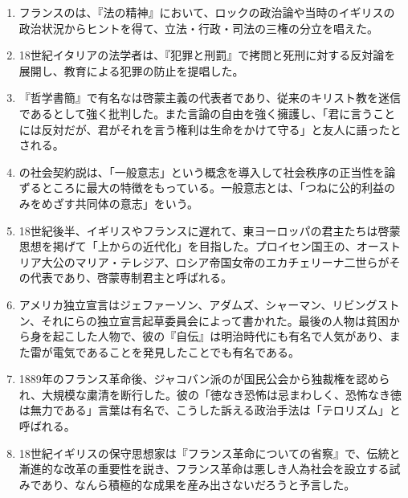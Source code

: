 \documentclass[uplatex,dvipdfmx]{jsarticle}
\begin{document}
\begin{enumerate}


  
\item フランスのは、『法の精神』において、ロックの政治論や当時のイギリスの政治状況からヒントを得て、立法・行政・司法の三権の分立を唱えた。


\item 18世紀イタリアの法学者は、『犯罪と刑罰』で拷問と死刑に対する反対論を展開し、教育による犯罪の防止を提唱した。
  
\item 『哲学書簡』で有名なは啓蒙主義の代表者であり、従来のキリスト教を迷信であるとして強く批判した。また言論の自由を強く擁護し、「君に言うことには反対だが、君がそれを言う権利は生命をかけて守る」と友人に語ったとされる。  

\item {}の社会契約説は、「一般意志」という概念を導入して社会秩序の正当性を論ずるところに最大の特徴をもっている。一般意志とは、「つねに公的利益のみをめざす共同体の意志」をいう。

\item 18世紀後半、イギリスやフランスに遅れて、東ヨーロッパの君主たちは啓蒙思想を掲げて「上からの近代化」を目指した。プロイセン国王の、オーストリア大公のマリア・テレジア、ロシア帝国女帝のエカチェリーナ二世らがその代表であり、啓蒙専制君主と呼ばれる。

\item アメリカ独立宣言はジェファーソン、アダムズ、シャーマン、リビングストン、それにらの独立宣言起草委員会によって書かれた。最後の人物は貧困から身を起こした人物で、彼の『自伝』は明治時代にも有名で人気があり、また雷が電気であることを発見したことでも有名である。
  
\item 1889年のフランス革命後、ジャコバン派のが国民公会から独裁権を認められ、大規模な粛清を断行した。彼の「徳なき恐怖は忌まわしく、恐怖なき徳は無力である」言葉は有名で、こうした訴える政治手法は「テロリズム」と呼ばれる。

\item 18世紀イギリスの保守思想家は『フランス革命についての省察』で、伝統と漸進的な改革の重要性を説き、フランス革命は悪しき人為社会を設立する試みであり、なんら積極的な成果を産み出さないだろうと予言した。
  
\end{enumerate}

\pagebreak{}
\end{document}
